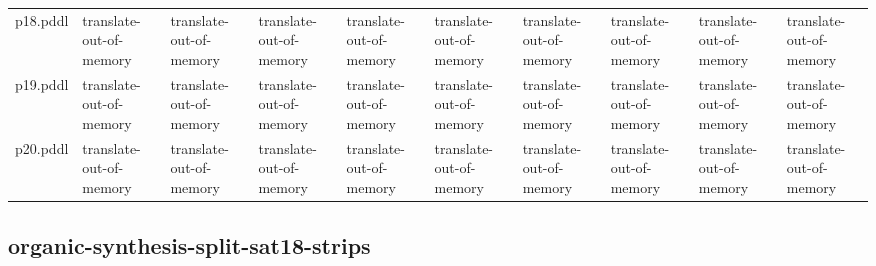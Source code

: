 \documentclass{article}
\begin{document}
\begin{tabular}{@{}lrrrrrrrrr@{}}
p18.pddl & \multicolumn{1}{|l|}{translate-out-of-memory} & \multicolumn{1}{|l|}{translate-out-of-memory} & \multicolumn{1}{|l|}{translate-out-of-memory} & \multicolumn{1}{|l|}{translate-out-of-memory} & \multicolumn{1}{|l|}{translate-out-of-memory} & \multicolumn{1}{|l|}{translate-out-of-memory} & \multicolumn{1}{|l|}{translate-out-of-memory} & \multicolumn{1}{|l|}{translate-out-of-memory} & \multicolumn{1}{|l|}{translate-out-of-memory} \\
p19.pddl & \multicolumn{1}{|l|}{translate-out-of-memory} & \multicolumn{1}{|l|}{translate-out-of-memory} & \multicolumn{1}{|l|}{translate-out-of-memory} & \multicolumn{1}{|l|}{translate-out-of-memory} & \multicolumn{1}{|l|}{translate-out-of-memory} & \multicolumn{1}{|l|}{translate-out-of-memory} & \multicolumn{1}{|l|}{translate-out-of-memory} & \multicolumn{1}{|l|}{translate-out-of-memory} & \multicolumn{1}{|l|}{translate-out-of-memory} \\
p20.pddl & \multicolumn{1}{|l|}{translate-out-of-memory} & \multicolumn{1}{|l|}{translate-out-of-memory} & \multicolumn{1}{|l|}{translate-out-of-memory} & \multicolumn{1}{|l|}{translate-out-of-memory} & \multicolumn{1}{|l|}{translate-out-of-memory} & \multicolumn{1}{|l|}{translate-out-of-memory} & \multicolumn{1}{|l|}{translate-out-of-memory} & \multicolumn{1}{|l|}{translate-out-of-memory} & \multicolumn{1}{|l|}{translate-out-of-memory} \\
\end{tabular}

\hypertarget{error-organic-synthesis-split-sat18-strips}{}
\subsection*{organic-synthesis-split-sat18-strips}
\end{document}
